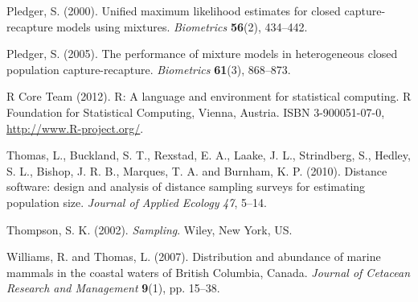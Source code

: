 \documentclass[useAMS,referee]{biom}
\begin{document}
\begin{thebibliography}{}
\bibitem{ } Pledger, S. (2000). Unified maximum likelihood estimates for closed capture-recapture models using mixtures. \textit{Biometrics} \textbf{56}(2), 434--442. 

\bibitem{ } Pledger, S. (2005). The performance of mixture models in heterogeneous closed population capture-recapture. \textit{Biometrics} \textbf{61}(3), 868--873.

\bibitem{ } R Core Team (2012). R: A language and environment for statistical computing. R Foundation for Statistical Computing, Vienna, Austria. ISBN 3-900051-07-0, \url{http://www.R-project.org/}.

\bibitem{ } Thomas, L., Buckland, S. T., Rexstad, E. A., Laake, J. L., Strindberg, S., Hedley, S. L., Bishop, J. R. B., Marques, T. A. and Burnham, K. P. (2010). Distance software: design and analysis of distance sampling surveys for estimating population size. \textit{Journal of Applied Ecology} \textit{47}, 5--14.

\bibitem{ } Thompson, S. K. (2002). \textit{Sampling}. Wiley, New York, US.

\bibitem{ } Williams, R. and Thomas, L. (2007). Distribution and abundance of marine mammals in the coastal waters of British Columbia, Canada. \textit{Journal of Cetacean Research and Management} \textbf{9}(1), pp. 15--38.

\end{thebibliography}

\label{lastpage}
\end{document}
